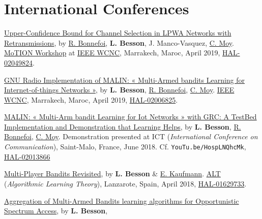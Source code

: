 \section*{International Conferences}
\renewcommand{\labelenumi}{[IC-\arabic{enumi}]}
\begin{etaremune}
\item
	\href{https://perso.crans.org/besson/articles/BMBBM__IEEE_WCNC__2019.pdf}{Upper-Confidence
	Bound for Channel Selection in LPWA Networks with Retransmissions},
	by \href{https://remibonnefoi.wordpress.com/}{R. Bonnefoi}, \textbf{L. Besson}, J.
	Manco-Vasquez,
  \href{https://moychris.wordpress.com/}{C. Moy}.
  \href{https://sites.google.com/view/wcncworkshop-motion2019/}{MoTION Workshop} at
  \href{http://wcnc2019.ieee-wcnc.org/}{IEEE WCNC},
  Marrakech, Maroc, April 2019, \href{https://hal.inria.fr/hal-02049824}{HAL-02049824}.
\item
  \href{https://perso.crans.org/besson/articles/BBM__IEEE_WCNC_2019.pdf}{GNU
  Radio Implementation of MALIN: « Multi-Armed bandits Learning for
  Internet-of-things Networks »}, by \textbf{L. Besson},
  \href{https://remibonnefoi.wordpress.com/}{R. Bonnefoi},
  \href{https://moychris.wordpress.com/}{C. Moy}.
  \href{http://wcnc2019.ieee-wcnc.org/}{IEEE WCNC},
  Marrakech, Maroc, April 2019, \href{https://hal.inria.fr/hal-02006825}{HAL-02006825}.
\item
  \href{https://perso.crans.org/besson/articles/BBM__Demo_ICT_2018.pdf}{MALIN:
  « Multi-Arm bandit Learning for Iot Networks » with GRC: A TestBed
  Implementation and Demonstration that Learning Helps}, by \textbf{L.
  Besson}, \href{https://remibonnefoi.wordpress.com/}{R. Bonnefoi},
  \href{https://moychris.wordpress.com/}{C. Moy}. Demonstration
  presented at ICT (\emph{International Conference on Communication}),
  Saint-Malo, France, June 2018. Cf. \texttt{YouTu.be/HospLNQhcMk}, \href{https://hal.inria.fr/hal-02013866}{HAL-02013866}
\item
  \href{https://hal.inria.fr/hal-01629733/document}{Multi-Player Bandits
  Revisited}, by \textbf{L. Besson} \&
  \href{http://chercheurs.lille.inria.fr/ekaufman/research.html}{E.
  Kaufmann}.
  \href{http://www.cs.cornell.edu/conferences/alt2018/accepted.html}{ALT}
  (\emph{Algorithmic Learning Theory}), Lanzarote, Spain, April 2018,
  \href{https://hal.inria.fr/hal-01629733}{HAL-01629733}.
\item
  \href{https://hal.inria.fr/hal-01705292/document}{Aggregation of
  Multi-Armed Bandits learning algorithms for Opportunistic Spectrum
  Access}, by \textbf{L. Besson},

\end{etaremune}
